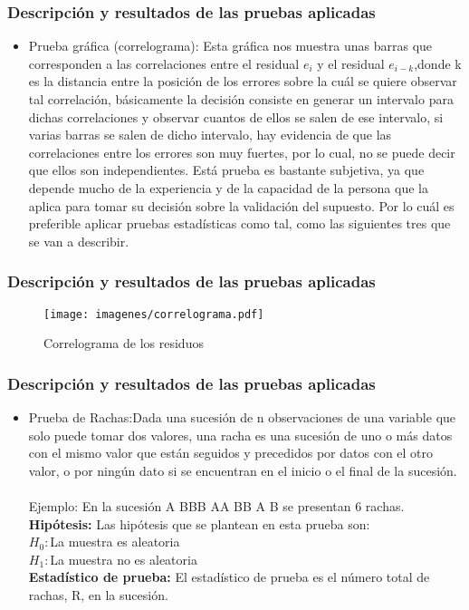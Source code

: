\documentclass[12pt]{beamer}
\begin{document}
\begin{frame}
\frametitle{Descripción y resultados de las pruebas aplicadas}
\begin{itemize}
\item Prueba gráfica (correlograma): Esta gráfica nos muestra unas barras que corresponden a las correlaciones entre el residual $e_{i}$ y el residual $e_{i-k}$,donde k es la distancia entre la posición de los errores sobre la cuál se quiere observar tal correlación, básicamente la decisión consiste en generar un intervalo para dichas correlaciones y observar cuantos de ellos se salen de ese intervalo, si varias barras se salen de dicho intervalo, hay evidencia de que las correlaciones entre los errores son muy fuertes, por lo cual, no se puede decir que ellos son independientes. Está prueba es bastante subjetiva, ya que depende mucho de la experiencia y de la capacidad de la persona que la aplica para tomar su decisión sobre la validación del supuesto. Por lo cuál es preferible aplicar pruebas estadísticas como tal, como las siguientes tres que se van a describir.
\end{itemize}
\end{frame}

\begin{frame}
\frametitle{Descripción y resultados de las pruebas aplicadas}
\begin{figure}[!h]
    \begin{center}
        \texttt{[image: imagenes/correlograma.pdf]}
        \caption{Correlograma de los residuos}
        \label{fig:Densidad}
    \end{center}
\end{figure}
\end{frame}

\begin{frame}
\frametitle{Descripción y resultados de las pruebas aplicadas}
\begin{itemize}
\item Prueba de Rachas:Dada una sucesión de n observaciones de una variable que solo puede tomar dos valores, una racha es una sucesión de uno o más datos con el mismo valor que están seguidos y precedidos por datos con el otro valor, o por ningún dato si se encuentran en el inicio o el final de la sucesión.
~\\ Ejemplo: En la sucesión A BBB AA BB A B se presentan 6 rachas.
~\\ \textbf{Hipótesis:} Las hipótesis que se plantean en esta prueba son:
~\\$H_{0}:$La muestra es aleatoria
~\\$H_{1}:$La muestra no es aleatoria
~\\ \textbf{Estadístico de prueba:} El estadístico de prueba es el número total de rachas, R, en la sucesión.
\end{itemize}
\end{frame}
\end{document}
